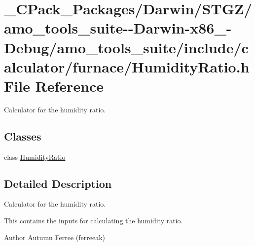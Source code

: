 \hypertarget{___c_pack___packages_2_darwin_2_s_t_g_z_2amo__tools__suite--_darwin-x86__64-_debug_2amo__tools__9140a135d1422db3dc81ed1affc4ef3d}{}\section{\+\_\+\+C\+Pack\+\_\+\+Packages/\+Darwin/\+S\+T\+G\+Z/amo\+\_\+tools\+\_\+suite-\/-\/\+Darwin-\/x86\+\_-\/\+Debug/amo\+\_\+tools\+\_\+suite/include/calculator/furnace/\+Humidity\+Ratio.h File Reference}
\label{___c_pack___packages_2_darwin_2_s_t_g_z_2amo__tools__suite--_darwin-x86__64-_debug_2amo__tools__9140a135d1422db3dc81ed1affc4ef3d}


Calculator for the humidity ratio.  


\subsection*{Classes}
\begin{DoxyCompactItemize}
\item 
class \hyperlink{class_humidity_ratio}{Humidity\+Ratio}
\end{DoxyCompactItemize}


\subsection{Detailed Description}
Calculator for the humidity ratio. 

This contains the inputs for calculating the humidity ratio.

\begin{DoxyAuthor}{Author}
Autumn Ferree (ferreeak) 
\end{DoxyAuthor}
